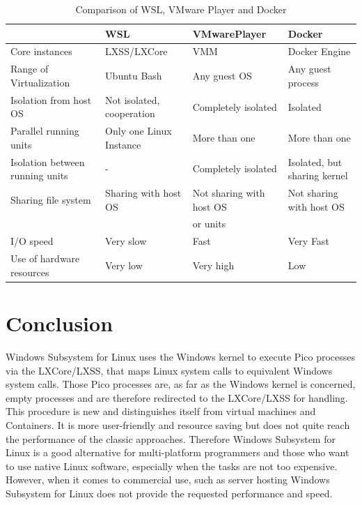 \documentclass[utf8,biblatex, ngerman, english]{lni}
\begin{document}
\clearpage
\begin{table}[!htbp]
\centering
\begin{tabular}{|l||l||l|l|} 
\hline
& WSL & VMwarePlayer & Docker \\ \hline 
Core instances & LXSS/LXCore &  VMM & Docker Engine \\ \hline 
Range of Virtualization & Ubuntu Bash & Any guest OS & Any guest process \\ \hline
Isolation from host OS & Not isolated, cooperation & Completely isolated & Isolated \\ \hline
Parallel running units & Only one Linux Instance & More than one  & More than one \\ \hline
Isolation between running units & -  &  Completely isolated & Isolated, but sharing kernel\\ \hline 
Sharing file system &  Sharing with host OS & Not sharing with host OS & Not sharing with host OS \\ 
& & or units & \\ \hline
I/O speed & Very slow & Fast & Very Fast \\ \hline
Use of hardware resources & Very low & Very high & Low \\ \hline

\end{tabular}
\caption{Comparison of WSL, VMware Player and Docker}
\label{tab:demo}
\end{table}


\section{Conclusion}
Windows Subsystem for Linux uses the Windows kernel to execute Pico processes via the LXCore/LXSS, that maps Linux system calls to equivalent Windows system calls. Those Pico processes are, as far as the Windows kernel is concerned, empty processes and are therefore redirected to the LXCore/LXSS for handling. This procedure is new and distinguishes itself from virtual machines and Containers. It is more user-friendly and resource saving but does not quite reach the performance of the classic approaches. Therefore Windows Subsystem for Linux is a good alternative for multi-platform programmers and those who want to use native Linux software, especially when the tasks are not too expensive. However, when it comes to commercial use, such as server hosting Windows Subsystem for Linux does not provide the requested performance and speed.

\newpage
{}
\printbibliography
\end{document}
